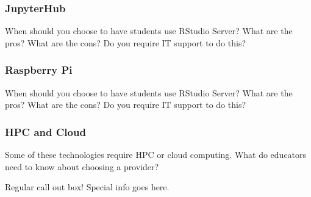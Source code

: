 \subsubsection{JupyterHub}\label{JupyterHub}

When should you choose to have students use RStudio Server?
What are the pros?
What are the cons?
Do you require IT support to do this?


\subsubsection{Raspberry Pi}\label{RaspberryPi}

When should you choose to have students use RStudio Server?
What are the pros?
What are the cons?
Do you require IT support to do this?


\subsubsection{HPC and Cloud}\label{HPC}

Some of these technologies require HPC or cloud computing. 
What do educators need to know about choosing a provider?

{\begin{framed}
Regular call out box! Special info goes here.
\end{framed}}




